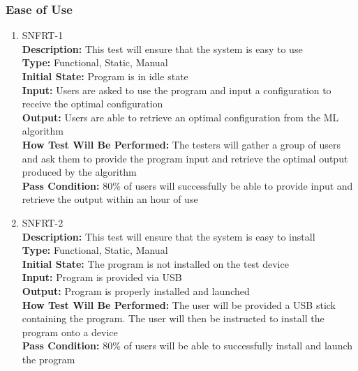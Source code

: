 \documentclass[12pt, titlepage]{article}
\begin{document}
\subsubsection{Ease of Use}
\begin{enumerate}
    \item{SNFRT-1\\}
    \textbf{Description:} This test will ensure that the system is easy to use\\
    \textbf{Type:} Functional, Static, Manual\\
    \textbf{Initial State:} Program is in idle state\\
    \textbf{Input:} Users are asked to use the program and input a configuration to receive the optimal configuration\\
    \textbf{Output:} Users are able to retrieve an optimal configuration from the ML algorithm\\
    \textbf{How Test Will Be Performed:} The testers will gather a group of users and ask them to provide the program input and retrieve the optimal output produced by the algorithm\\
    \textbf{Pass Condition:} 80\% of users will successfully be able to provide input and retrieve the output within an hour of use\\

    \item{SNFRT-2\\}
    \textbf{Description:} This test will ensure that the system is easy to install\\
    \textbf{Type:} Functional, Static, Manual\\
    \textbf{Initial State:} The program is not installed on the test device\\
    \textbf{Input:} Program is provided via USB\\
    \textbf{Output:} Program is properly installed and launched\\
    \textbf{How Test Will Be Performed:} The user will be provided a USB stick containing the program. The user will then be instructed to install the program onto a device\\
    \textbf{Pass Condition:} 80\% of users will be able to successfully install and launch the program\\
\end{enumerate}
\end{document}
